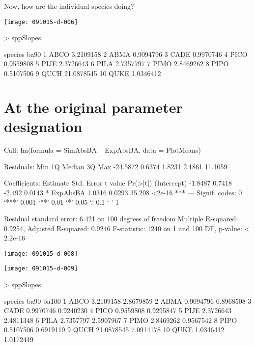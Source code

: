 \documentclass{article}
\begin{document}
Now, how are the individual species doing?

\texttt{[image: 091015-d-006]}
\begin{Schunk}
\begin{Sinput}
>   sppSlopes
\end{Sinput}
\begin{Soutput}
   species       ba90
1     ABCO  3.2109158
2     ABMA  0.9094796
3     CADE  0.9970746
4     PICO  0.9559808
5     PIJE  2.3726643
6     PILA  2.7357797
7     PIMO  2.8469262
8     PIPO  0.5107506
9     QUCH 21.0878545
10    QUKE  1.0346412
\end{Soutput}
\end{Schunk}


\newpage
\section{At the original parameter designation}
\begin{Schunk}
\begin{Soutput}
Call:
lm(formula = SimAbsBA ~ ExpAbsBA, data = PlotMeans)

Residuals:
     Min       1Q   Median       3Q      Max 
-24.5872   0.6374   1.8231   2.1861  11.1059 

Coefficients:
            Estimate Std. Error t value Pr(>|t|)    
(Intercept)  -1.8487     0.7418  -2.492   0.0143 *  
ExpAbsBA      1.0316     0.0293  35.208   <2e-16 ***
---
Signif. codes:  0 ‘***’ 0.001 ‘**’ 0.01 ‘*’ 0.05 ‘.’ 0.1 ‘ ’ 1

Residual standard error: 6.421 on 100 degrees of freedom
Multiple R-squared:  0.9254,	Adjusted R-squared:  0.9246 
F-statistic:  1240 on 1 and 100 DF,  p-value: < 2.2e-16
\end{Soutput}
\end{Schunk}
\texttt{[image: 091015-d-008]}

\texttt{[image: 091015-d-009]}
\begin{Schunk}
\begin{Sinput}
>   sppSlopes
\end{Sinput}
\begin{Soutput}
   species       ba90     ba100
1     ABCO  3.2109158 2.8679859
2     ABMA  0.9094796 0.8968508
3     CADE  0.9970746 0.9240230
4     PICO  0.9559808 0.9295847
5     PIJE  2.3726643 2.4811348
6     PILA  2.7357797 2.5907967
7     PIMO  2.8469262 0.9567542
8     PIPO  0.5107506 0.6919119
9     QUCH 21.0878545 7.0914178
10    QUKE  1.0346412 1.0172449
\end{Soutput}
\end{Schunk}
\end{document}
